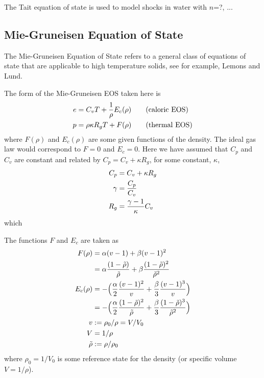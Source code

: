 \documentclass{article}
\begin{document}


The Tait equation of state is used to model shocks in water with $n$=?, ...


\newcommand{\cpc}{\kappa}
\clearpage
\subsection{Mie-Gruneisen Equation of State}
\newcommand{\rhot}{{\tilde\rho}}

The Mie-Gruneisen Equation of State refers to a general class of equations of state that 
are applicable to high temperature solids, see for example,
Lemons and Lund\cite{LemonsLund1999}.

The form of the Mie-Gruneisen EOS taken here is 
\begin{align}
 e & =  C_v T + {1 \over \rho} E_c(\rho) \qquad\mbox{(caloric EOS)}\label{eq:MGeos1} \\
 p & = \rho \cpc R_g T + F(\rho)                \qquad\mbox{(thermal EOS)}\label{eq:MGeos2}
\end{align}
where $F(\rho)$ and $E_c(\rho)$ are some given functions of the density.  The ideal gas law would 
correspond to $F=0$ and $E_c=0$.
Here we have assumed that $C_p$ and $C_v$ are constant and related by $C_p = C_v + \cpc R_g$,
for some constant, $\cpc$,
\begin{align*}
   C_p &= C_v + \cpc R_g \\
  \gamma &= {C_p\over C_v} \\
   R_g &= {\gamma -1 \over \cpc } C_v 
\end{align*}
which

The functions $F$ and $E_c$ are taken as
\begin{align}
  F(\rho) &= \alpha (v-1) + \beta (v-1)^2 \\
          &= \alpha {(1-\rhot)\over\rhot} + \beta {(1-\rhot)^2 \over \rhot^2} \\
  E_c(\rho) & = -\Big( {\alpha\over2} {(v-1)^2 \over v} + {\beta\over3} { (v-1)^3\over v} \Big)  \\
     & = - \Big( {\alpha\over2} {(1-\rhot)^2 \over \rhot} + {\beta\over3} { (1-\rhot)^3\over \rhot^2}  \Big) \\
     v &:= \rho_0/\rho = V/V_0  \\
     V &= 1/\rho \\
    \rhot &:= \rho/\rho_0
\end{align}
where $\rho_0=1/V_0$ is some reference state for the density (or specific volume $V=1/\rho$).
\end{document}
